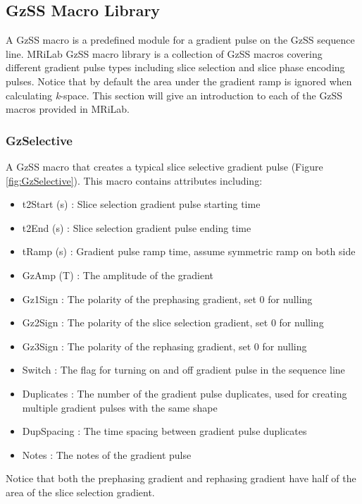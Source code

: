 \documentclass{book}%
\begin{document}
\subsection{GzSS Macro Library}

A GzSS macro is a predefined module for a gradient pulse on the GzSS sequence line. MRiLab GzSS macro library is a collection of GzSS macros covering different gradient pulse types including slice selection and slice phase encoding pulses. Notice that by default the area under the gradient ramp is ignored when calculating \textit{k}-space. This section will give an introduction to each of the GzSS macros provided in MRiLab.

\subsubsection{GzSelective}

A GzSS macro that creates a typical slice selective gradient pulse (Figure \ref{fig:GzSelective}). This macro contains attributes including:

\begin{itemize}
	\item t2Start (s) : Slice selection gradient pulse starting time
	\item t2End (s) : Slice selection gradient pulse ending time
	\item tRamp (s) : Gradient pulse ramp time, assume symmetric ramp on both side
	\item GzAmp (T) : The amplitude of the gradient
	\item Gz1Sign : The polarity of the prephasing gradient, set 0 for nulling
	\item Gz2Sign : The polarity of the slice selection gradient, set 0 for nulling
	\item Gz3Sign : The polarity of the rephasing gradient, set 0 for nulling
	\item Switch : The flag for turning on and off gradient pulse in the sequence line
	\item Duplicates : The number of the gradient pulse duplicates, used for creating multiple gradient pulses with the same shape
	\item DupSpacing : The time spacing between gradient pulse duplicates
	\item Notes : The notes of the gradient pulse 
\end{itemize}

Notice that both the prephasing gradient and rephasing gradient have half of the area of the slice selection gradient.
\end{document}
